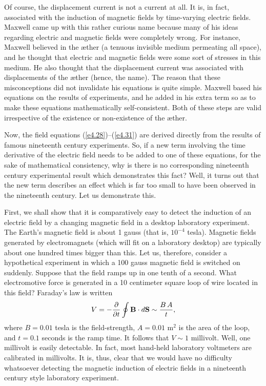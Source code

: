 Of course, the displacement current is not a current at all. It is, in fact, 
associated with the  induction of   magnetic fields by  time-varying electric
fields. Maxwell came up with this rather  curious name because many of his ideas 
regarding electric and magnetic fields were completely wrong. For instance, Maxwell
believed in the \ae ther (a tenuous invisible medium permeating all space), and he thought that electric and magnetic fields were some
sort of stresses in this medium. He also thought that the displacement current
was associated with  displacements of the \ae ther (hence, the name). The
reason that these misconceptions did not invalidate his equations is quite simple.
Maxwell based his equations on the results of experiments, and he  added in his
extra term so as to make these equations  mathematically self-consistent.
Both of these steps are valid irrespective of the existence or non-existence
of the \ae ther.

Now, the field equations (\ref{e4.28})--(\ref{e4.31}) are derived directly from the results
of famous nineteenth century experiments. So, if  a new term involving
the time derivative of the electric field needs to
be added to one of these equations, for the sake of mathematical consistency,
why is there is no corresponding nineteenth century experimental result which demonstrates
this fact?  Well, it turns out that the new term describes an effect which is far too small
to have  been observed in the nineteenth century. Let us demonstrate
this. 

First, we shall show that it is comparatively easy to detect the induction of
an electric field by a changing magnetic field in a desktop laboratory experiment. 
The Earth's magnetic field is about 1 gauss (that is, $10^{-4}$ tesla). 
Magnetic fields generated by electromagnets (which will fit on a laboratory desktop)
are typically about one hundred times bigger than this. Let us, therefore,
consider a hypothetical experiment in which a 100 gauss magnetic field is
switched on suddenly. Suppose that the field ramps up in one tenth of a second.
What electromotive force is generated in a 10 centimeter square loop of wire
located in this field? Faraday's law is written
\begin{equation}
V = -\frac{\partial}{\partial t} \oint {\bf B}\cdot d{\bf S} \sim  \frac{ B\,A}{t},
\end{equation}
where $B=0.01$ tesla is the field-strength, $A=0.01$ m$^2$ is the area of the loop,
and $t=0.1$ seconds is the ramp time. It follows that $V \sim 1$ millivolt. Well,
one millivolt is easily detectable. In fact, most hand-held laboratory voltmeters
are calibrated in millivolts. It is, thus,  clear that we would have no difficulty
whatsoever detecting the magnetic induction of electric fields in a nineteenth century
style laboratory experiment. 

